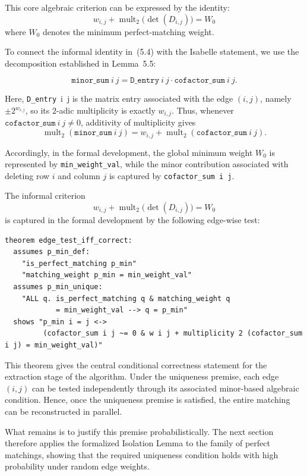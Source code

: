 This core algebraic criterion can be expressed by the identity:
\begin{equation}
w_{i,j} + \operatorname{mult}_2\!\bigl(\det(D_{i,j})\bigr) = W_0
\end{equation}
where $W_0$ denotes the minimum perfect-matching weight.

To connect the informal identity in~(5.4) with the Isabelle statement, we use the decomposition established in Lemma~5.5:

\[
\texttt{minor\_sum}\ i\ j
=
\texttt{D\_entry}\ i\ j \cdot \texttt{cofactor\_sum}\ i\ j .
\]

Here, \texttt{D\_entry}\ i\ j is the matrix entry associated with the edge $(i,j)$, namely $\pm 2^{w_{i,j}}$, so its $2$-adic multiplicity is exactly $w_{i,j}$.
Thus, whenever $\texttt{cofactor\_sum}\ i\ j \neq 0$, additivity of multiplicity gives
\[
\operatorname{mult}_2(\texttt{minor\_sum}\ i\ j)
=
w_{i,j} + \operatorname{mult}_2(\texttt{cofactor\_sum}\ i\ j).
\]

Accordingly, in the formal development, the global minimum weight $W_0$ is represented by \texttt{min\_weight\_val}, while the minor contribution associated with deleting row $i$ and column $j$ is captured by \texttt{cofactor\_sum i j}.

The informal criterion
\[
w_{i,j} + \operatorname{mult}_2\!\bigl(\det(D_{i,j})\bigr) = W_0
\]
is captured in the formal development by the following edge-wise test:

\biglistingneedspace
\begin{lstlisting}[language=Isabelle, caption={Correctness of Edge Extraction}]
theorem edge_test_iff_correct:
  assumes p_min_def: 
    "is_perfect_matching p_min" 
    "matching_weight p_min = min_weight_val"
  assumes p_min_unique: 
    "ALL q. is_perfect_matching q & matching_weight q 
            = min_weight_val --> q = p_min"
  shows "p_min i = j <-> 
         (cofactor_sum i j ~= 0 & w i j + multiplicity 2 (cofactor_sum i j) = min_weight_val)"
\end{lstlisting}

This theorem gives the central conditional correctness statement for the extraction stage of the algorithm.
Under the uniqueness premise, each edge $(i, j)$ can be tested independently through its associated minor-based algebraic condition.
Hence, once the uniqueness premise is satisfied, the entire matching can be reconstructed in parallel.

What remains is to justify this premise probabilistically.
The next section therefore applies the formalized Isolation Lemma to the family of perfect matchings, showing that the required uniqueness condition holds with high probability under random edge weights.

